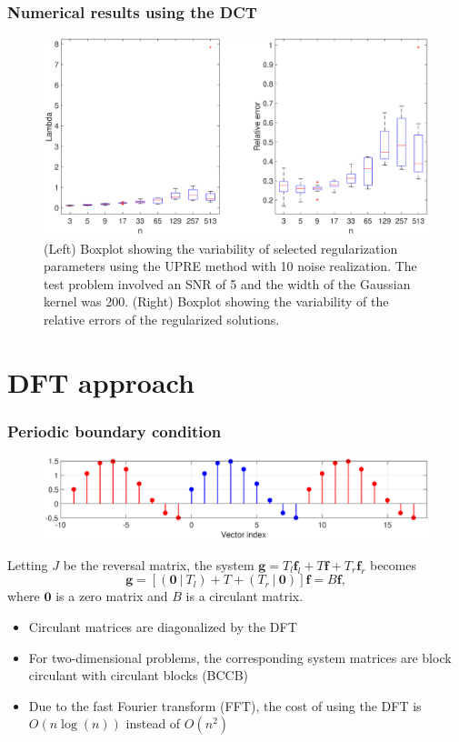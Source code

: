 \documentclass[t]{beamer}
\newcommand{\gVec}{\mathbf{g}}	%
\newcommand{\fVec}{\mathbf{f}}	%
\begin{document}
\begin{frame}
\frametitle{Numerical results using the DCT}
\begin{figure}
\centering
\includegraphics[scale=0.25]{Figures/UPRE_Boxes.eps}
\caption{(Left) Boxplot showing the variability of selected regularization parameters using the UPRE method with 10 noise realization. The test problem involved an SNR of 5 and the width of the Gaussian kernel was 200. (Right) Boxplot showing the variability of the relative errors of the regularized solutions.}
\end{figure}
\end{frame}

\section{DFT approach}

\begin{frame}
\frametitle{Periodic boundary condition}
\begin{figure}
\centering
\includegraphics[scale=0.25]{Figures/PeriodicBC.eps}
\end{figure}
Letting $J$ be the reversal matrix, the system $\gVec = T_{l}\fVec_{l} + T\fVec + T_{r}\fVec_{r}$ becomes
\[\gVec = [(\mathbf{0}~|~T_{l}) + T + (T_{r}~|~\mathbf{0})]\fVec = B\fVec,\]
where $\mathbf{0}$ is a zero matrix and $B$ is a circulant matrix.
\begin{itemize}
\item Circulant matrices are diagonalized by the DFT
\item For two-dimensional problems, the corresponding system matrices are block circulant with circulant blocks (BCCB) \cite{Vogel:2002}
\item Due to the fast Fourier transform (FFT), the cost of using the DFT is $O(n\log(n))$ instead of $O(n^2)$ \cite{CooleyTukey}
\end{itemize}
\end{frame}
\end{document}
